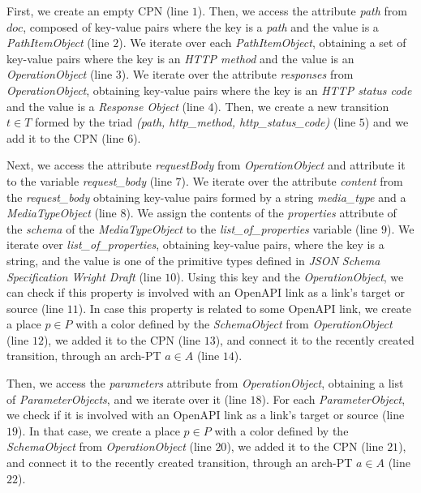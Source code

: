 First, we create an empty CPN (line $1$). Then, we access the attribute \textit{path} from  $doc$, composed of key-value pairs where the key is a \textit{path} and the value is a \textit{PathItemObject} (line $2$).
We iterate over each \textit{PathItemObject}, obtaining a set of key-value pairs where the key is an \textit{HTTP method} and the value is an \textit{OperationObject} (line $3$).
We iterate over the attribute \textit{responses} from \textit{OperationObject}, obtaining key-value pairs where the key is an \textit{HTTP status code} and the value is a \textit{Response Object} (line $4$).
Then, we create a new transition \(t \in T\) formed by the triad \textit{(path, http\_method, http\_status\_code)} (line $5$) and we add it to the CPN (line $6$).

Next, we access the attribute \textit{requestBody} from \textit{OperationObject} and attribute it to the variable \textit{request\_body} (line $7$).
We iterate over the attribute \textit{content} from the \textit{request\_body} obtaining key-value pairs formed by a string \textit{media\_type} and a \textit{MediaTypeObject} (line $8$). 
We assign the contents of the \textit{properties} attribute of the \textit{schema} of the \textit{MediaTypeObject} to the \textit{list\_of\_properties} variable (line $9$).
We iterate over \textit{list\_of\_properties}, obtaining key-value pairs, where the key is a string, and the value is one of the primitive types defined in \textit{JSON Schema Specification Wright Draft} (line $10$).
Using this key and the \textit{OperationObject}, we can check if this property is involved with an OpenAPI link as a link's target or source (line $11$).
In case this property is related to some OpenAPI link, we create a place \( p \in P\) with a color defined by the \textit{SchemaObject} from \textit{OperationObject} (line $12$), we added it to the CPN (line $13$), and connect it to the recently created transition, through an arch-PT \(a \in A\) (line $14$).

Then, we access the \textit{parameters} attribute from \textit{OperationObject}, obtaining a list of \textit{ParameterObjects}, and we iterate over it (line $18$).
For each \textit{ParameterObject}, we check if it is involved with an OpenAPI link as a link's target or source (line $19$). In that case, we create a place  \( p \in P\) with a color defined by the \textit{SchemaObject} from \textit{OperationObject} (line $20$), we added it to the CPN (line $21$), and connect it to the recently created transition, through an arch-PT \(a \in A\) (line $22$).

